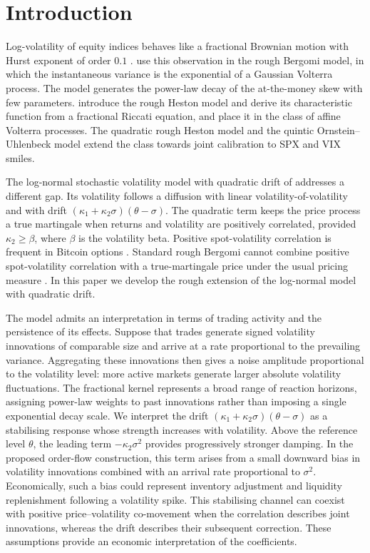\documentclass{rQUF2e}
\theoremstyle{plain}
\theoremstyle{definition}
\theoremstyle{remark}
\begin{document}
\section{Introduction}\label{sec:intro}

Log-volatility of equity indices behaves like a fractional Brownian motion with Hurst exponent of order $0.1$ \citep{GatheralJaissonRosenbaum2018}. \citet{BayerFrizGatheral2016} use this observation in the rough Bergomi model, in which the instantaneous variance is the exponential of a Gaussian Volterra process. The model generates the power-law decay of the at-the-money skew with few parameters. \citet{ElEuchRosenbaum2019} introduce the rough Heston model and derive its characteristic function from a fractional Riccati equation, and \citet{AbiJaberLarssonPulido2019} place it in the class of affine Volterra processes. The quadratic rough Heston model \citep{GatheralJusselinRosenbaum2020} and the quintic Ornstein--Uhlenbeck model \citep{AbiJaberIllandLi2022} extend the class towards joint calibration to SPX and VIX smiles.

The log-normal stochastic volatility model with quadratic drift of \citet{SeppRakhmonov2023} addresses a different gap. Its volatility follows a diffusion with linear volatility-of-volatility and with drift $(\kappa_1+\kappa_2\sigma)(\theta-\sigma)$. The quadratic term keeps the price process a true martingale when returns and volatility are positively correlated, provided $\kappa_2\ge\beta$, where $\beta$ is the volatility beta. Positive spot-volatility correlation is frequent in Bitcoin options \citep{SeppRakhmonov2023}. Standard rough Bergomi cannot combine positive spot-volatility correlation with a true-martingale price under the usual pricing measure \citep{Gassiat2019}. In this paper we develop the rough extension of the log-normal model with quadratic drift.

The model admits an interpretation in terms of trading activity and
the persistence of its effects. Suppose that trades generate signed
volatility innovations of comparable size and arrive at a rate
proportional to the prevailing variance. Aggregating these innovations
then gives a noise amplitude proportional to the volatility level:
more active markets generate larger absolute volatility fluctuations.
The fractional kernel represents a broad range of reaction horizons,
assigning power-law weights to past innovations rather than imposing
a single exponential decay scale. We interpret the drift
$(\kappa_1+\kappa_2\sigma)(\theta-\sigma)$ as a stabilising response
whose strength increases with volatility. Above the reference level
$\theta$, the leading term $-\kappa_2\sigma^2$ provides progressively
stronger damping. In the proposed order-flow construction, this term
arises from a small downward bias in volatility innovations combined
with an arrival rate proportional to $\sigma^2$. Economically, such
a bias could represent inventory adjustment and liquidity
replenishment following a volatility spike. This stabilising channel
can coexist with positive price--volatility co-movement when the
correlation describes joint innovations, whereas the drift describes
their subsequent correction. These assumptions provide an economic
interpretation of the coefficients.
\end{document}
